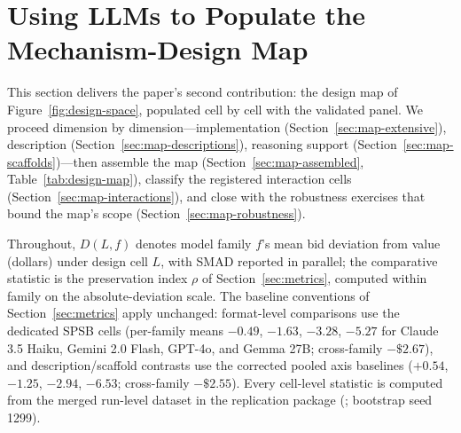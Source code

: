 
\section{Using LLMs to Populate the Mechanism-Design Map}\label{sec:map}

This section delivers the paper's second contribution: the design map of Figure~\ref{fig:design-space}, populated cell by cell with the validated panel. We proceed dimension by dimension---implementation (Section~\ref{sec:map-extensive}), description (Section~\ref{sec:map-descriptions}), reasoning support (Section~\ref{sec:map-scaffolds})---then assemble the map (Section~\ref{sec:map-assembled}, Table~\ref{tab:design-map}), classify the registered interaction cells (Section~\ref{sec:map-interactions}), and close with the robustness exercises that bound the map's scope (Section~\ref{sec:map-robustness}).

Throughout, $D(L,f)$ denotes model family $f$'s mean bid deviation from value (dollars) under design cell $L$, with SMAD reported in parallel; the comparative statistic is the preservation index $\rho$ of Section~\ref{sec:metrics}, computed within family on the absolute-deviation scale. The baseline conventions of Section~\ref{sec:metrics} apply unchanged: format-level comparisons use the dedicated SPSB cells (per-family means $-0.49$, $-1.63$, $-3.28$, $-5.27$ for Claude 3.5 Haiku, Gemini 2.0 Flash, GPT-4o, and Gemma 27B; cross-family $-\$2.67$), and description/scaffold contrasts use the corrected pooled axis baselines ($+0.54$, $-1.25$, $-2.94$, $-6.53$; cross-family $-\$2.55$). Every cell-level statistic is computed from the merged run-level dataset in the replication package (; bootstrap seed 1299).


